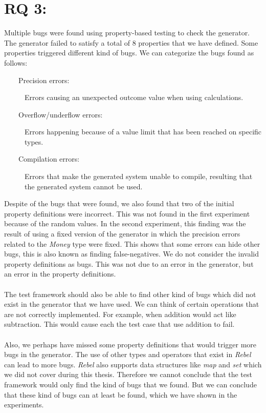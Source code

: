 \section{RQ 3: \rqThree{}}
Multiple bugs were found using property-based testing to check the generator.
The generator failed to satisfy a total of 8 properties that we have defined.
Some properties triggered different kind of bugs. We can categorize the bugs found as follows:
\begin{description}
  \item[~~~~Precision errors:] Errors causing an unexpected outcome value when using calculations.
  \item[~~~~Overflow/underflow errors:] Errors happening because of a value limit that has been reached on specific types.
  \item[~~~~Compilation errors:] Errors that make the generated system unable to compile, resulting that the generated system cannot be used.
\end{description}
Despite of the bugs that were found, we also found that two of the initial property definitions were incorrect. This was not found in the first experiment because of the random values. In the second experiment, this finding was the result of using a fixed version of the generator in which the precision errors related to the \textit{Money} type were fixed. This shows that some errors can hide other bugs, this is also known as finding false-negatives. We do not consider the invalid property definitions as bugs. This was not due to an error in the generator, but an error in the property definitions.\\
\\
The test framework should also be able to find other kind of bugs which did not exist in the generator that we have used. We can think of certain operations that are not correctly implemented. For example, when addition would act like subtraction. This would cause each the test case that use addition to fail.\\
\\
Also, we perhaps have missed some property definitions that would trigger more bugs in the generator. The use of other types and operators that exist in \textit{Rebel} can lead to more bugs. \textit{Rebel} also supports data structures like \textit{map} and \textit{set} which we did not cover during this thesis. Therefore we cannot conclude that the test framework would only find the kind of bugs that we found. But we can conclude that these kind of bugs can at least be found, which we have shown in the experiments.\\
\\


